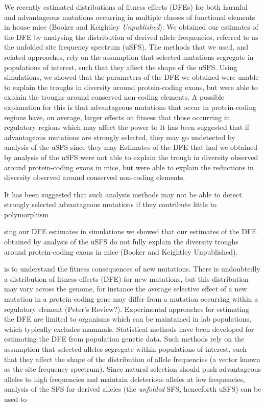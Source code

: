 \documentclass[11pt]{article}
\begin{document}
We recently estimated distributions of fitness effects (DFEs) for both harmful and advantageous mutations occurring in multiple classes of functional elements in house mice (Booker and Keightley \textit{Unpublished}). We obtained our estimates of the DFE by analysing the distribution of derived allele frequencies, referred to as the unfolded site frequency spectrum (uSFS). The methods that we used, and related approaches, rely on the assumption that selected mutations segregate in populations of interest, such that they affect the shape of the uSFS. Using simulations, we showed that the parameters of the DFE we obtained were unable to explain the troughs in diversity around protein-coding exons, but were able to explain the troughs around conserved non-coding elements. A possible explanation for this is that advantageous mutations that occur in protein-coding regions have, on average, larger effects on fitness that those occurring in regulatory regions which may affect the power to 
It has been suggested that if advantageous mutations are strongly selected, they may go undetected by analysis of the uSFS since they may 
 Estimates of the DFE that had we obtained by analysis of the uSFS were not able to explain the trough in diversity observed around protein-coding exons in mice, but were able to explain the reductions in diversity observed around conserved non-coding elements. 

It has been suggested that such analysis methods may not be able to detect strongly selected advantageous mutations if they contribute little to polymorphism

sing our DFE estimates in simulations we showed that our estimates of the DFE obtained by analysis of the uSFS do not fully explain the diversity troughs around protein-coding exons in mice (Booker and Keightley Unpublished). 


 is to understand the fitness consequences of new mutations. There is undoubtedly a distribution of fitness effects (DFE) for new mutations, but this distribution may vary across the genome, for instance the average selective effect of a new mutation in a protein-coding gene may differ from a mutation occurring within a regulatory element (Peter's Review?). Experimental approaches for estimating the DFE are limited to organisms which can be maintained in lab populations, which typically excludes mammals. Statistical methods have been developed for estimating the DFE from population genetic data. Such methods rely on the assumption that selected alleles segregate within populations of interest, such that they affect the shape of the distribution of allele frequencies (a vector known as the site frequency spectrum). Since natural selection should push advantageous alleles to high frequencies and maintain deleterious alleles at low frequencies, analysis of the SFS for derived alleles (the \textit{unfolded} SFS, henceforth uSFS) can be used to 
\end{document}

